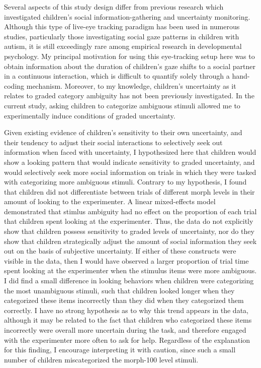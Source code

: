 \documentclass[,man,floatsintext]{apa6}
\begin{document}
Several aspects of this study design differ from previous research which investigated children's social information-gathering and uncertainty monitoring. Although this type of live-eye tracking paradigm has been used in numerous studies, particularly those investigating social gaze patterns in children with autism, it is still exceedingly rare among empirical research in developmental psychology. My principal motivation for using this eye-tracking setup here was to obtain information about the duration of children's gaze shifts to a social partner in a continuous interaction, which is difficult to quantify solely through a hand-coding mechanism. Moreover, to my knowledge, children's uncertainty as it relates to graded category ambiguity has not been previously investigated. In the current study, asking children to categorize ambiguous stimuli allowed me to experimentally induce conditions of graded uncertainty.

Given existing evidence of children's sensitivity to their own uncertainty, and their tendency to adjust their social interactions to selectively seek out information when faced with uncertainty, I hypothesized here that children would show a looking pattern that would indicate sensitivity to graded uncertainty, and would selectively seek more social information on trials in which they were tasked with categorizing more ambiguous stimuli. Contrary to my hypothesis, I found that children did not differentiate between trials of different morph levels in their amount of looking to the experimenter. A linear mixed-effects model demonstrated that stimlus ambiguity had no effect on the proportion of each trial that children spent looking at the experimenter. Thus, the data do not explicitly show that children possess sensitivity to graded levels of uncertainty, nor do they show that children strategically adjust the amount of social information they seek out on the basis of subjective uncertainty. If either of these constructs were visible in the data, then I would have observed a larger proportion of trial time spent looking at the experimenter when the stimulus items were more ambiguous. I did find a small difference in looking behaviors when children were categorizing the most unambiguous stimuli, such that children looked longer when they categorized these items incorrectly than they did when they categorized them correctly. I have no strong hypothesis as to why this trend appears in the data, although it may be related to the fact that children who categorized these items incorrectly were overall more uncertain during the task, and therefore engaged with the experimenter more often to ask for help. Regardless of the explanation for this finding, I encourage interpreting it with caution, since such a small number of children miscategorized the morph-100 level stimuli.
\end{document}
